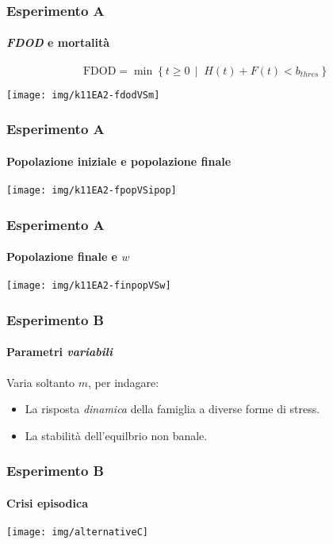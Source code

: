 \documentclass[]{beamer}
\newcommand{\st}{\,\mid\;}
\begin{document}
\begin{frame}
    \frametitle{Esperimento A}
    \framesubtitle{\emph{FDOD} e mortalità}

    $$\text{FDOD} = \min \left\{ t \geq 0 \st H(t) + F(t) < b_{thres} \right\}$$

    \pause
    \begin{center}
        \texttt{[image: img/k11EA2-fdodVSm]}
    \end{center}
\end{frame}

\begin{frame}
    \frametitle{Esperimento A}
    \framesubtitle{Popolazione iniziale e popolazione finale}

    \begin{center}
        \texttt{[image: img/k11EA2-fpopVSipop]}
    \end{center}
\end{frame}

\begin{frame}
    \frametitle{Esperimento A}
    \framesubtitle{Popolazione finale e $w$}

    \begin{center}
        \texttt{[image: img/k11EA2-finpopVSw]}
    \end{center}
\end{frame}

\begin{frame}
    \frametitle{Esperimento B}
    \framesubtitle{Parametri \emph{variabili}}

    Varia soltanto $m$, per indagare:
    \begin{itemize}
        \item La risposta \emph{dinamica} della famiglia a diverse forme di stress.
        \item \pause La stabilità dell'equilbrio non banale.
    \end{itemize}
\end{frame}

\begin{frame}
    \frametitle{Esperimento B}
    \framesubtitle{Crisi episodica}

    \begin{center}
        \texttt{[image: img/alternativeC]}
    \end{center}
\end{frame}
\end{document}
